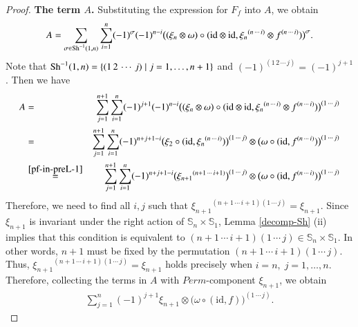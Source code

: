 \documentclass[12pt]{amsart}
\theoremstyle{definition}
\newcommand{\id}{\mathrm{id}}
\newcommand{\ot}{\otimes}
\newcommand{\s}{\mathbb{S}}
\newcommand{\Sh}{{\rm Sh}}
\begin{document}
\begin{proof}
\textbf{The term $A$.}
Substituting the expression for $F_f$ into $A$, we obtain
$$
A=\sum\limits_{\sigma\in\Sh^{-1}(1,n)} \sum\limits_{i=1}^{n}(-1)^{\sigma}(-1)^{n-i}\bigl((\xi_n\otimes\omega)\circ(\id\otimes\id, {\xi_n}^{(n\,\cdots\,i)}\ot f^{(n\,\cdots\,i)})\bigr)^{\sigma}.
$$ Note that $\Sh^{-1}(1,n)=\{(1\,2\,\cdots\,j)\mid j=1,\dots,n+1\}$ and $(-1)^{(1\,2\,\cdots\,j)}=(-1)^{j+1}$.
 Then  we have
	\begin{eqnarray*}
		A&=&\sum\limits_{j=1}^{n+1}\sum\limits_{i=1}^{n} (-1)^{j+1}(-1)^{n-i} \bigl((\xi_n\ot\omega)\circ(\id\ot\id,{\xi_n}^{(n\,\cdots\,i)}\ot f^{(n\,\cdots\,i)})\bigr)^{(1\,\cdots\,j)}\\
		&=&\sum\limits_{j=1}^{n+1}\sum\limits_{i=1}^{n} (-1)^{n+j+1-i}\bigl(\xi_2\circ(\id,{\xi_n}^{(n\,\cdots\,i)})\bigr)^{(1\,\cdots\,j)}\ot \bigl(\omega\circ(\id, f^{(n\,\cdots\,i)})\bigr)^{(1\,\cdots\,j)}\\
		&\overset{\eqref{pf-in-preL-1}}{=}&\sum\limits_{j=1}^{n+1}\sum\limits_{i=1}^{n} (-1)^{n+j+1-i}\bigl({\xi_{n+1}}^{(n+1\,\cdots\,i+1)}\bigr)^{(1\,\cdots\,j)}\ot \bigl(\omega\circ(\id, f^{(n\,\cdots\,i)})\bigr)^{(1\,\cdots\,j)}
	\end{eqnarray*}
Therefore, we need to find all $i,j$ such that ${\xi_{n+1}}^{(n+1\,\cdots\,i+1)(1\,\cdots\,j)}=\xi_{n+1}$. Since $\xi_{n+1}$ is invariant under the right action of $\s_n\times\s_1$, Lemma \ref{decomp-Sh} {\rm (ii)} implies that this condition is equivalent to
$
(n+1\,\cdots\,i+1)(1\,\cdots\,j)\in\s_n\times\s_1.
$
In other words, $n+1$ must be fixed by the permutation
$
(n+1\,\cdots\,i+1)(1\,\cdots\,j).
$
Thus, ${\xi_{n+1}}^{(n+1\,\cdots\,i+1)(1\,\cdots\,j)}=\xi_{n+1}$ holds precisely when $i=n,\; j=1,\ldots,n.$
 Therefore, collecting the terms in $A$ with $Perm$-component $\xi_{n+1}$, we obtain
\begin{align}\label{eq-preL-cochain-1}
	\sum_{j=1}^{n}
	(-1)^{j+1}
	\xi_{n+1}\otimes
	\bigl(\omega\circ(\id,f)\bigr)^{(1\,\cdots\,j)}.
\end{align}
	


\end{proof}
\end{document}

